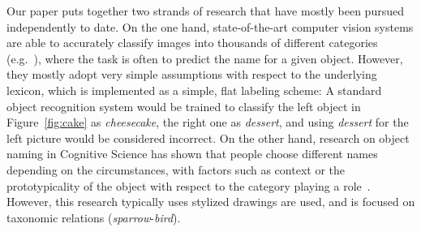 Our paper puts together two strands of research that have mostly been pursued independently to date.
On the one hand, state-of-the-art computer vision systems are able to accurately classify images into thousands of different categories (e.g.\  ), where the task is often to predict the name for a given object. 
However, they mostly adopt very simple assumptions with respect to the underlying lexicon, which is implemented as a simple, flat labeling scheme: A standard object recognition system would be trained to classify the left object in Figure~\ref{fig:cake} as \emph{cheesecake}, the right one as \emph{dessert}, and using \emph{dessert} for the left picture would be considered incorrect.
On the other hand, research on object naming in Cognitive Science has shown that people choose different names depending on the circumstances, with factors such as context or the prototypicality of the object with respect to the category playing a role~\cite{add-refs}.
However, this research typically uses stylized drawings are used, and is focused on taxonomic relations (\textit{sparrow}-\textit{bird}).






